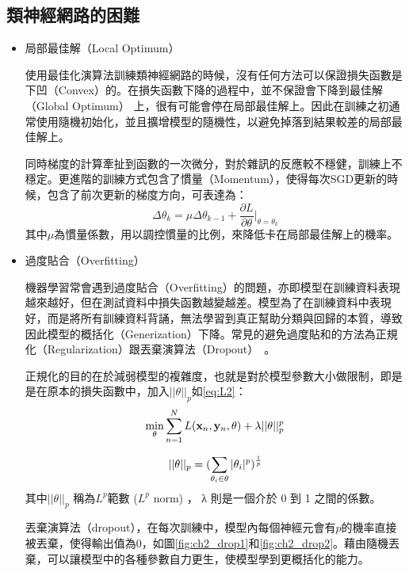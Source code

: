 \subsection{類神經網路的困難}
\begin{itemize}
\item{局部最佳解（Local Optimum）}

	使用最佳化演算法訓練類神經網路的時候，沒有任何方法可以保證損失函數是下凹（Convex）的。在損失函數下降的過程中，並不保證會下降到最佳解（Global Optimum） 上，很有可能會停在局部最佳解上。因此在訓練之初通常使用隨機初始化，並且擴增模型的隨機性，以避免掉落到結果較差的局部最佳解上。

同時梯度的計算牽扯到函數的一次微分，對於雜訊的反應較不穩健，訓練上不穩定。更進階的訓練方式包含了慣量（Momentum），使得每次SGD更新的時候，包含了前次更新的梯度方向，可表達為：
\begin{equation}
\Delta \theta_{k} =  \mu \Delta \theta_{k-1} + \frac{\partial L}{\partial \theta} \biggr|_{\theta = \theta_k}
\end{equation}
其中$\mu$為慣量係數，用以調控慣量的比例，來降低卡在局部最佳解上的機率。
\item{過度貼合（Overfitting）}
	
	機器學習常會遇到過度貼合（Overfitting）的問題，亦即模型在訓練資料表現越來越好，但在測試資料中損失函數越變越差。模型為了在訓練資料中表現好，而是將所有訓練資料背誦，無法學習到真正幫助分類與回歸的本質，導致因此模型的概括化（Generization）下降。常見的避免過度貼和的方法為正規化（Regularization）跟丟棄演算法（Dropout）~\cite{srivastava2014dropout}。
	
	正規化的目的在於減弱模型的複雜度，也就是對於模型參數大小做限制，即是是在原本的損失函數中，加入$||\theta||_p$如\ref{eq:L2}：
\begin{equation}
\label{eq:L2}
\min_{\theta}{ \sum_{n=1}^{N}{ {L( \bold{x}_n ,\bold{y}_n,\theta)}}+\lambda||\theta||_p^p}
\end{equation}

\begin{equation}
\label{eq:norm}
||\theta||_p = ( \sum_{\theta_i \in \bold{\theta}}{|\theta_i|^p} )^\frac{1}{p}
\end{equation}
其中$||\theta||_p$ 稱為$L^p$範數 ($L^p$ norm) ， λ 則是一個介於 0 到 1 之間的係數。

	丟棄演算法（dropout），在每次訓練中，模型內每個神經元會有$p$的機率直接被丟棄，使得輸出值為0，如圖\ref{fig:ch2_drop1}和\ref{fig:ch2_drop2}。藉由隨機丟棄，可以讓模型中的各種參數自力更生，使模型學到更概括化的能力。


\end{itemize}
